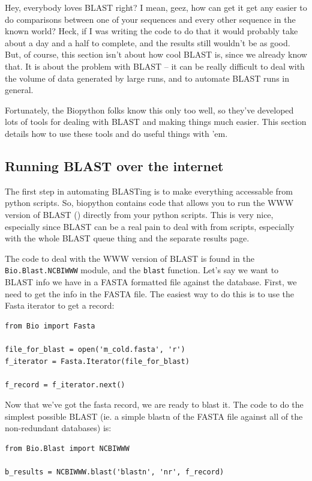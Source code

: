\documentclass{report}
\begin{document}
Hey, everybody loves BLAST right? I mean, geez, how can get it get any easier to do comparisons between one of your sequences and every other sequence in the known world? Heck, if I was writing the code to do that it would probably take about a day and a half to complete, and the results still wouldn't be as good. But, of course, this section isn't about how cool BLAST is, since we already know that. It is about the problem with BLAST -- it can be really difficult to deal with the volume of data generated by large runs, and to automate BLAST runs in general.


Fortunately, the Biopython folks know this only too well, so they've developed lots of tools for dealing with BLAST and making things much easier. This section details how to use these tools and do useful things with 'em. 

\subsection{Running BLAST over the internet}

The first step in automating BLASTing is to make everything accessable from python scripts. So, biopython contains code that allows you to run the WWW version of BLAST () directly from your python scripts. This is very nice, especially since BLAST can be a real pain to deal with from scripts, especially with the whole BLAST queue thing and the separate results page.


The code to deal with the WWW version of BLAST is found in the \verb|Bio.Blast.NCBIWWW| module, and the \verb|blast| function. Let's say we want to BLAST info we have in a FASTA formatted file against the database. First, we need to get the info in the FASTA file. The easiest way to do this is to use the Fasta iterator to get a record:

\begin{verbatim}
from Bio import Fasta

file_for_blast = open('m_cold.fasta', 'r')
f_iterator = Fasta.Iterator(file_for_blast)

f_record = f_iterator.next()
\end{verbatim}

Now that we've got the fasta record, we are ready to blast it. The code to do the simplest possible BLAST (ie. a simple blastn of the FASTA file against all of the non-redundant databases) is:

\begin{verbatim}
from Bio.Blast import NCBIWWW

b_results = NCBIWWW.blast('blastn', 'nr', f_record)
\end{verbatim}
\end{document}
